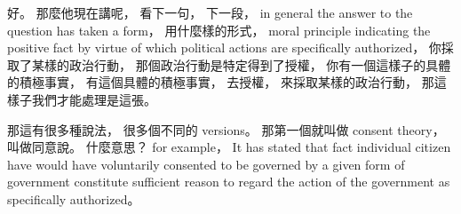 \hypertarget{w02:cue:1058}{}好。
\hypertarget{w02:cue:1059}{}那麼他現在講呢，
\hypertarget{w02:cue:1060}{}看下一句，
\hypertarget{w02:cue:1061}{}下一段，
\hypertarget{w02:cue:1062}{}in general
\hypertarget{w02:cue:1063}{}the answer to the question has taken a form，
\hypertarget{w02:cue:1064}{}用什麼樣的形式，
\hypertarget{w02:cue:1065}{}moral principle
\hypertarget{w02:cue:1066}{}indicating the positive fact
\hypertarget{w02:cue:1067}{}by virtue of which
\hypertarget{w02:cue:1068}{}political actions are specifically authorized，
\hypertarget{w02:cue:1069}{}你採取了某樣的政治行動，
\hypertarget{w02:cue:1070}{}那個政治行動是特定得到了授權，
\hypertarget{w02:cue:1071}{}你有一個這樣子的具體的積極事實，
\hypertarget{w02:cue:1072}{}有這個具體的積極事實，
\hypertarget{w02:cue:1073}{}去授權，
\hypertarget{w02:cue:1074}{}來採取某樣的政治行動，
\hypertarget{w02:cue:1075}{}那這樣子我們才能處理是這張。

\hypertarget{w02:cue:1076}{}那這有很多種說法，
\hypertarget{w02:cue:1077}{}很多個不同的 versions。
\hypertarget{w02:cue:1078}{}那第一個就叫做 consent theory，
\hypertarget{w02:cue:1079}{}叫做同意說。
\hypertarget{w02:cue:1080}{}什麼意思？
\hypertarget{w02:cue:1081}{}for example，
\hypertarget{w02:cue:1082}{}It has stated that fact
\hypertarget{w02:cue:1083}{}individual citizen have
\hypertarget{w02:cue:1084}{}would have voluntarily consented to be governed
\hypertarget{w02:cue:1085}{}by a given form of government
\hypertarget{w02:cue:1086}{}constitute sufficient reason to regard the action of the government
\hypertarget{w02:cue:1087}{}as specifically authorized。

